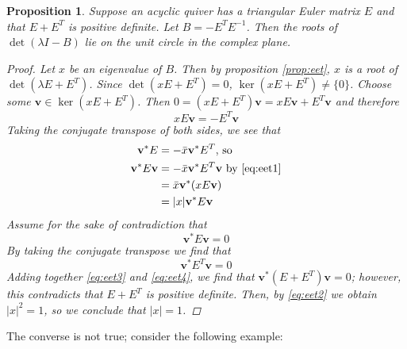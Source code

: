 \documentclass{amsart}
\newcommand*\conj[1]{\bar{#1}}
\theoremstyle{theorem}
\theoremstyle{theorem*}
\newtheorem{proposition}[theorem]{Proposition}
\theoremstyle{definition}
\begin{document}
\begin{proposition} Suppose an acyclic quiver has a
    triangular Euler matrix $E$ and that $E + E^T$ is positive definite.
    Let $B = -E^T E^{-1}$.
    Then the roots of $\det(\lambda I - B)$ lie on the unit circle in the
    complex plane.
    \begin{proof}
        Let $x$ be an eigenvalue of $B$. Then by proposition \ref{prop:eet},
        $x$ is a root of $\det(\lambda E + E^T)$. Since $\det(xE + E^T) = 0$,
        $\ker(xE + E^T) \neq \{0\}$.
        Choose some $\textbf{v} \in \ker(xE + E^T)$.
        Then $0 = (xE + E^T)\textbf{v} = xE\textbf{v} + E^T\textbf{v}$
        and therefore 
        \begin{equation} \label{eq:eet1}
            xE\textbf{v} = - E^T\textbf{v}
        \end{equation}
        Taking the conjugate transpose of both sides, we see that
        \begin{equation} \label{eq:eet2}
            \begin{split}
                \textbf{v}^* E &= - \conj{x} \textbf{v}^* E^T\text{, so}\\
                \textbf{v}^* E \textbf{v} &= - \conj{x} \textbf{v}^* E^T \textbf{v}
                \text{ by \eqref{eq:eet1}}\\
                &= \conj{x} \textbf{v}^*(x E \textbf{v})\\
                &= |x| \textbf{v}^* E \textbf{v}
            \end{split}
        \end{equation}
        Assume for the sake of contradiction that
        \begin{equation}\label{eq:eet3}
            \textbf{v}^* E \textbf{v} = 0
        \end{equation}
        By taking the conjugate transpose
        we find that
        \begin{equation}\label{eq:eet4}
            \textbf{v}^* E^T \textbf{v} = 0
        \end{equation}
        Adding together \eqref{eq:eet3} and \eqref{eq:eet4}, we find
        that $\textbf{v}^*(E + E^T)\textbf{v} = 0$; however, this
        contradicts that $E + E^T$ is positive definite. Then, by \eqref{eq:eet2}
        we obtain $|x|^2 = 1$, so we conclude that $|x| = 1$.
    \end{proof}
\end{proposition}

The converse is not true; consider the following example:
\end{document}
